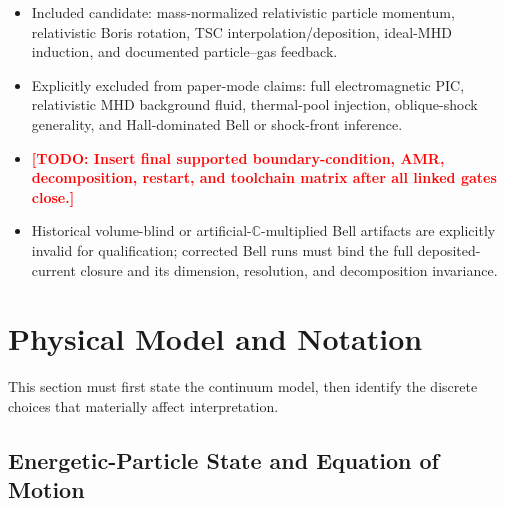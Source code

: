 \documentclass[twocolumn]{aastex701}
\newcommand{\TODO}[1]{\textcolor{red}{\textbf{[TODO: #1]}}}
\begin{document}
\begin{itemize}
\item Included candidate: mass-normalized relativistic particle momentum,
relativistic Boris rotation, TSC interpolation/deposition, ideal-MHD induction,
and documented particle--gas feedback.
\item Explicitly excluded from paper-mode claims: full electromagnetic PIC,
relativistic MHD background fluid, thermal-pool injection, oblique-shock
generality, and Hall-dominated Bell or shock-front inference.
\item \TODO{Insert final supported boundary-condition, AMR, decomposition,
restart, and toolchain matrix after all linked gates close.}
\item Historical volume-blind or artificial-$\mathbb{C}$-multiplied Bell
artifacts are explicitly invalid for qualification; corrected Bell runs must
bind the full deposited-current closure and its dimension, resolution, and
decomposition invariance.
\end{itemize}

\section{Physical Model and Notation}
\label{sec:model}

This section must first state the continuum model, then identify the discrete
choices that materially affect interpretation.

\subsection{Energetic-Particle State and Equation of Motion}
\end{document}
